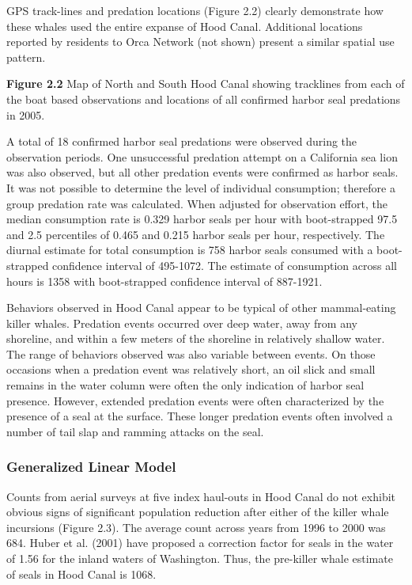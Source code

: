 GPS track-lines and predation locations (Figure 2.2) clearly demonstrate
how these whales used the entire expanse of Hood Canal. Additional
locations reported by residents to Orca Network (not shown) present a
similar spatial use pattern.

\textbf{Figure 2.2} Map of North and South Hood Canal showing tracklines
from each of the boat based observations and locations of all confirmed
harbor seal predations in 2005.

A total of 18 confirmed harbor seal predations were observed during the
observation periods. One unsuccessful predation attempt on a California
sea lion was also observed, but all other predation events were
confirmed as harbor seals. It was not possible to determine the level of
individual consumption; therefore a group predation rate was calculated.
When adjusted for observation effort, the median consumption rate is
0.329 harbor seals per hour with boot-strapped 97.5 and 2.5 percentiles
of 0.465 and 0.215 harbor seals per hour, respectively. The diurnal
estimate for total consumption is 758 harbor seals consumed with a
boot-strapped confidence interval of 495-1072. The estimate of
consumption across all hours is 1358 with boot-strapped confidence
interval of 887-1921.

Behaviors observed in Hood Canal appear to be typical of other
mammal-eating killer whales. Predation events occurred over deep water,
away from any shoreline, and within a few meters of the shoreline in
relatively shallow water. The range of behaviors observed was also
variable between events. On those occasions when a predation event was
relatively short, an oil slick and small remains in the water column
were often the only indication of harbor seal presence. However,
extended predation events were often characterized by the presence of a
seal at the surface. These longer predation events often involved a
number of tail slap and ramming attacks on the seal.

\subsubsection{Generalized Linear
Model}\label{generalized-linear-model-1}

Counts from aerial surveys at five index haul-outs in Hood Canal do not
exhibit obvious signs of significant population reduction after either
of the killer whale incursions (Figure 2.3). The average count across
years from 1996 to 2000 was 684. Huber et al. (2001) have proposed a
correction factor for seals in the water of 1.56 for the inland waters
of Washington. Thus, the pre-killer whale estimate of seals in Hood
Canal is 1068.

